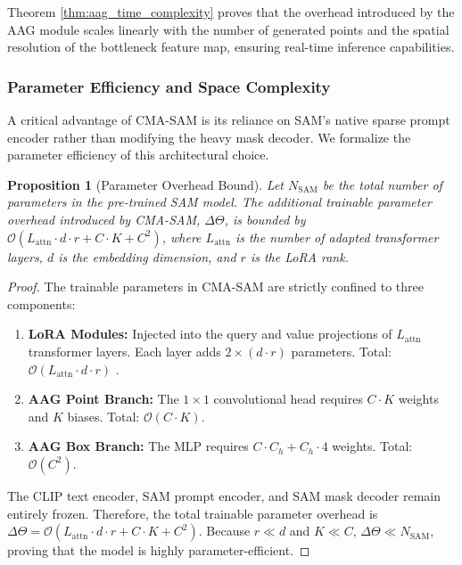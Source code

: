 \documentclass[onecolumn]{IEEEtran}
\numberwithin{equation}{section}
\newtheorem{proposition}[theorem]{Proposition}
\theoremstyle{definition}
\theoremstyle{remark}
\begin{document}
Theorem \ref{thm:aag_time_complexity} proves that the overhead introduced by the AAG module scales linearly with the number of generated points and the spatial resolution of the bottleneck feature map, ensuring real-time inference capabilities.

\subsubsection{Parameter Efficiency and Space Complexity}

A critical advantage of CMA-SAM is its reliance on SAM's native sparse prompt encoder rather than modifying the heavy mask decoder. We formalize the parameter efficiency of this architectural choice.

\begin{proposition}[Parameter Overhead Bound]
\label{prop:param_overhead}
Let $N_{\text{SAM}}$ be the total number of parameters in the pre-trained SAM model. The additional trainable parameter overhead introduced by CMA-SAM, $\Delta \Theta$, is bounded by $\mathcal{O}(L_{\text{attn}} \cdot d \cdot r + C \cdot K + C^2)$, where $L_{\text{attn}}$ is the number of adapted transformer layers, $d$ is the embedding dimension, and $r$ is the LoRA rank.
\end{proposition}

\begin{proof}
The trainable parameters in CMA-SAM are strictly confined to three components:
\begin{enumerate}
    \item \textbf{LoRA Modules:} Injected into the query and value projections of $L_{\text{attn}}$ transformer layers. Each layer adds $2 \times (d \cdot r)$ parameters. Total: $\mathcal{O}(L_{\text{attn}} \cdot d \cdot r)$ \cite{zhang2023customized}.
    \item \textbf{AAG Point Branch:} The $1 \times 1$ convolutional head requires $C \cdot K$ weights and $K$ biases. Total: $\mathcal{O}(C \cdot K)$.
    \item \textbf{AAG Box Branch:} The MLP requires $C \cdot C_h + C_h \cdot 4$ weights. Total: $\mathcal{O}(C^2)$.
\end{enumerate}
The CLIP text encoder, SAM prompt encoder, and SAM mask decoder remain entirely frozen. Therefore, the total trainable parameter overhead is $\Delta \Theta = \mathcal{O}(L_{\text{attn}} \cdot d \cdot r + C \cdot K + C^2)$. Because $r \ll d$ and $K \ll C$, $\Delta \Theta \ll N_{\text{SAM}}$, proving that the model is highly parameter-efficient.
\end{proof}
\end{document}
